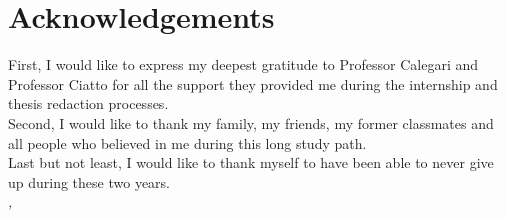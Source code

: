 
\cleardoublepage
{}
{}



\begingroup
\let\clearpage\relax
\let\cleardoublepage\relax
\let\cleardoublepage\relax

\chapter*{Acknowledgements}

\noindent First, I would like to express my deepest gratitude to Professor Calegari and Professor Ciatto for all the support they provided me during the internship and thesis redaction processes.\\

\noindent Second, I would like to thank my family, my friends, my former classmates and all people who believed in me during this long study path.\\


\noindent Last but not least, I would like to thank myself to have been able to never give up during these two years. \\

\noindent\textit{\myLocation, \myTime}
\hfill \myName

\endgroup

